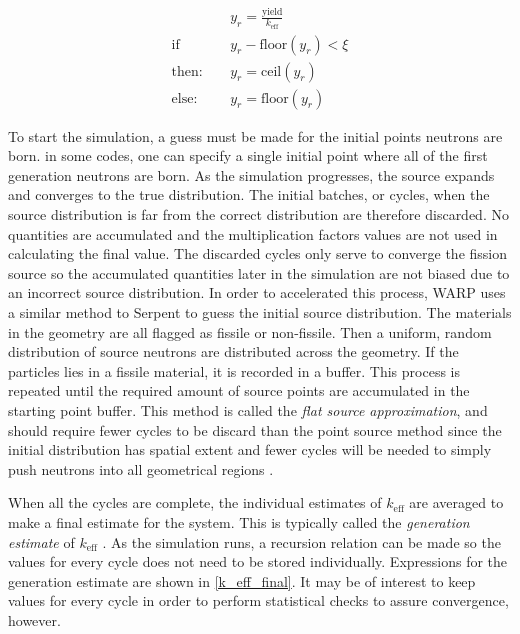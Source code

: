\begin{equation}
\label{stoch_rounding}
\begin{split}
&y_r = \frac{\mathrm{yield}}{k_\mathrm{eff}} \\
\mathrm{if}\quad &y_r - \mathrm{floor}(y_r)<\xi \\
\mathrm{then:}\quad &y_r=\mathrm{ceil}(y_r) \\
\mathrm{else:}\quad &y_r=\mathrm{floor}(y_r)
\end{split}
\end{equation}

To start the simulation, a guess must be made for the initial points neutrons are born.  in some codes, one can specify a single initial point where all of the first generation neutrons are born.  As the simulation progresses, the source expands and converges to the true distribution.  The initial batches, or cycles, when the source distribution is far from the correct distribution are therefore discarded.  No quantities are accumulated and the multiplication factors values are not used in calculating the final value.  The discarded cycles only serve to converge the fission source so the accumulated quantities later in the simulation are not biased due to an incorrect source distribution.  In order to accelerated this process, WARP uses a similar method to Serpent to guess the initial source distribution.  The materials in the geometry are all flagged as fissile or non-fissile.  Then a uniform, random distribution of source neutrons are distributed across the geometry.  If the particles lies in a fissile material, it is recorded in a buffer.  This process is repeated until the required amount of source points are accumulated in the starting point buffer.  This method is called the \emph{flat source approximation}, and should require fewer cycles to be discard than the point source method since the initial distribution has spatial extent and fewer cycles will be needed to simply push neutrons into all geometrical regions \cite{jaakko}.

When all the cycles are complete, the individual estimates of $k_\mathrm{eff}$ are averaged to make a final estimate for the system.  This is typically called the \emph{generation estimate} of $k_\mathrm{eff}$ \cite{jaakko}.  As the simulation runs, a recursion relation can be made so the values for every cycle does not need to be stored individually.  Expressions for the generation estimate are shown in \eqref{k_eff_final}.  It may be of interest to keep values for every cycle in order to perform statistical checks to assure convergence, however.

